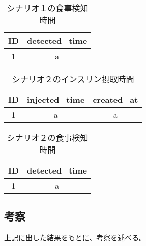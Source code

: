 \begin{table}[htbp]
  \caption{シナリオ１の食事検知時間}
  \label{tb:scenario_1_meal}
  \begin{center}
    \begin{tabular}{|c||c|}
      \hline
      ID  & detected\_time \\
      \hline\hline
      1 & a \\\hline
    \end{tabular}
  \end{center}
\end{table}

\begin{table}[htbp]
  \caption{シナリオ２のインスリン摂取時間}
  \label{tb:scenario_1_insulin}
  \begin{center}
    \begin{tabular}{|c||c|c|}
      \hline
      ID  & injected\_time & created\_at \\
      \hline\hline
      1 & a & a \\\hline
    \end{tabular}
  \end{center}
\end{table}

\begin{table}[htbp]
  \caption{シナリオ２の食事検知時間}
  \label{tb:scenario_2_meal}
  \begin{center}
    \begin{tabular}{|c||c|}
      \hline
      ID  & detected\_time \\
      \hline\hline
      1 &  a \\\hline
    \end{tabular}
  \end{center}
\end{table}

\subsection{考察}

上記に出した結果をもとに、考察を述べる。

